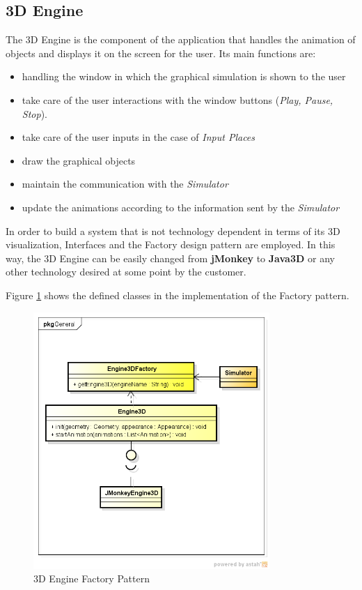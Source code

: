 \subsection{3D Engine}

The 3D Engine is the component of the application that handles the animation of objects and displays it on the screen for the user. Its main functions are: 

\begin{itemize}
\item handling the window in which the graphical simulation is shown to the user
\item take care of the user interactions with the window buttons (\textit{Play, Pause, Stop}).
\item take care of the user inputs in the case of \textit{Input Places}
\item draw the graphical objects
\item maintain the communication with the \textit{Simulator}
\item update the animations according to the information sent by the \textit{Simulator}
\end{itemize}

In order to build a system that is not technology dependent in terms of its 3D visualization, Interfaces and the Factory design pattern are employed. In this way, the 3D Engine can be easily changed from \textbf{jMonkey} to \textbf{Java3D} or any other technology desired at some point by the customer. 

Figure \ref{fig:factory} shows the defined classes in the implementation of the Factory pattern.

\begin{figure}[htp]
\begin{center}
  \includegraphics[width=0.8\textwidth]{image/engine_factory.png}
  \caption{3D Engine Factory Pattern}
  \label{fig:factory}
\end{center}
\end{figure} 

